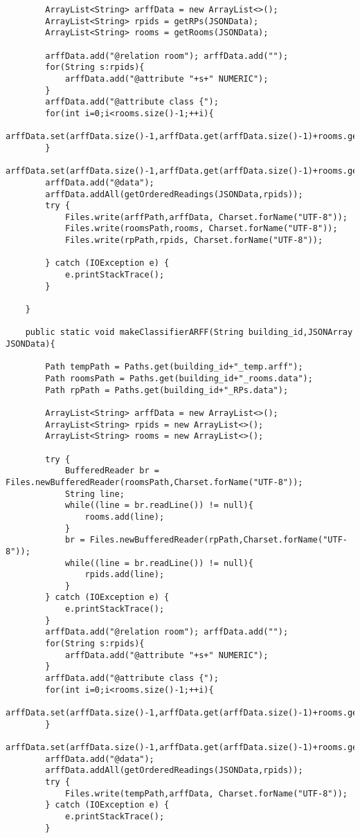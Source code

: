 \documentclass{article}
\begin{document}
\begin{lstlisting}
        ArrayList<String> arffData = new ArrayList<>();
        ArrayList<String> rpids = getRPs(JSONData);
        ArrayList<String> rooms = getRooms(JSONData);

        arffData.add("@relation room"); arffData.add("");
        for(String s:rpids){
            arffData.add("@attribute "+s+" NUMERIC");
        }
        arffData.add("@attribute class {");
        for(int i=0;i<rooms.size()-1;++i){
            arffData.set(arffData.size()-1,arffData.get(arffData.size()-1)+rooms.get(i)+",");
        }
        arffData.set(arffData.size()-1,arffData.get(arffData.size()-1)+rooms.get(rooms.size()-1)+"}");
        arffData.add("@data");
        arffData.addAll(getOrderedReadings(JSONData,rpids));
        try {
            Files.write(arffPath,arffData, Charset.forName("UTF-8"));
            Files.write(roomsPath,rooms, Charset.forName("UTF-8"));
            Files.write(rpPath,rpids, Charset.forName("UTF-8"));

        } catch (IOException e) {
            e.printStackTrace();
        }

    }

    public static void makeClassifierARFF(String building_id,JSONArray JSONData){

        Path tempPath = Paths.get(building_id+"_temp.arff");
        Path roomsPath = Paths.get(building_id+"_rooms.data");
        Path rpPath = Paths.get(building_id+"_RPs.data");

        ArrayList<String> arffData = new ArrayList<>();
        ArrayList<String> rpids = new ArrayList<>();
        ArrayList<String> rooms = new ArrayList<>();

        try {
            BufferedReader br = Files.newBufferedReader(roomsPath,Charset.forName("UTF-8"));
            String line;
            while((line = br.readLine()) != null){
                rooms.add(line);
            }
            br = Files.newBufferedReader(rpPath,Charset.forName("UTF-8"));
            while((line = br.readLine()) != null){
                rpids.add(line);
            }
        } catch (IOException e) {
            e.printStackTrace();
        }
        arffData.add("@relation room"); arffData.add("");
        for(String s:rpids){
            arffData.add("@attribute "+s+" NUMERIC");
        }
        arffData.add("@attribute class {");
        for(int i=0;i<rooms.size()-1;++i){
            arffData.set(arffData.size()-1,arffData.get(arffData.size()-1)+rooms.get(i)+",");
        }
        arffData.set(arffData.size()-1,arffData.get(arffData.size()-1)+rooms.get(rooms.size()-1)+"}");
        arffData.add("@data");
        arffData.addAll(getOrderedReadings(JSONData,rpids));
        try {
            Files.write(tempPath,arffData, Charset.forName("UTF-8"));
        } catch (IOException e) {
            e.printStackTrace();
        }


\end{lstlisting}
\end{document}
